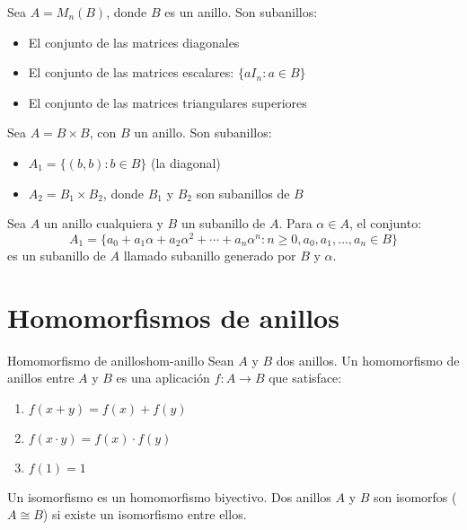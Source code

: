 \begin{example}{}{}
    Sea \(A = M_n(B)\), donde \(B\) es un anillo. Son subanillos:
    \begin{itemize}
        \item El conjunto de las matrices diagonales
        \item El conjunto de las matrices escalares: \(\{a I_n : a \in B\}\)
        \item El conjunto de las matrices triangulares superiores
    \end{itemize}
\end{example}

\begin{example}{}{}
    Sea \(A = B \times B\), con \(B\) un anillo. Son subanillos:
    \begin{itemize}
        \item \(A_1 = \{(b, b) : b \in B\}\) (la diagonal)
        \item \(A_2 = B_1 \times B_2\), donde \(B_1\) y \(B_2\) son subanillos de \(B\)
    \end{itemize}
\end{example}

\begin{example}{}{}
    Sea \(A\) un anillo cualquiera y \(B\) un subanillo de \(A\). Para \(\alpha \in A\), el conjunto:
    \[
    A_1 = \{a_0 + a_1\alpha + a_2\alpha^2 + \cdots + a_n\alpha^n : n \geq 0, a_0, a_1, \ldots, a_n \in B\}
    \]
    es un subanillo de \(A\) llamado {subanillo generado por \(B\) y \(\alpha\)}.
\end{example}

\clearpage
\section{Homomorfismos de anillos}

\begin{definition}{Homomorfismo de anillos}{hom-anillo}
    Sean \(A\) y \(B\) dos anillos. Un homomorfismo de anillos entre \(A\) y \(B\) es una aplicación \(f: A \to B\) que satisface:
    \begin{enumerate}
        \item \(f(x + y) = f(x) + f(y)\)
        \item \(f(x \cdot y) = f(x) \cdot f(y)\)
        \item \(f(1) = 1\)
    \end{enumerate}
    
    Un isomorfismo es un homomorfismo biyectivo. Dos anillos \(A\) y \(B\) son isomorfos (\(A \cong B\)) si existe un isomorfismo entre ellos.
\end{definition}

